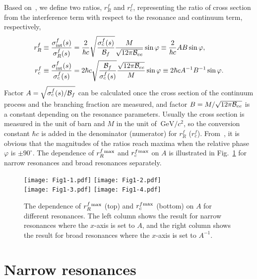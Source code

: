 \documentclass[%
preprint,
 amsmath,amssymb,
 aps,
]{revtex4-2}
\newcommand{\br}{{\cal B}}
\newcommand{\gevcc}{\mathrm{GeV}/c^2}
\begin{document}
Based on~, we define two ratios, $r_{R}^{f}$ 
and $r_{c}^{f}$, representing the ratio of cross section from the interference 
term with respect to the resonance and continuum term, respectively,
\begin{align}\label{eq:r}
    r_{R}^{f} & \equiv \frac{\sigma_{\rm int}^{f}(s)}{\sigma_{R}^{f}(s)} = 
    \frac{2}{\hbar c}\sqrt{\frac{\sigma_{c}^f(s)}{\br_{f}}}
    \frac{M}{\sqrt{12\pi\br_{ee}}}\sin\varphi
    \equiv \frac{2}{\hbar c} A B\sin\varphi,\\ \nonumber
    r_{c}^{f} & \equiv \frac{\sigma_{\rm int}^f(s)}{\sigma_{c}^f(s)} = 
    2{\hbar c}\sqrt{\frac{\br_{f}}{\sigma_{c}^f(s)}} 
    \frac{\sqrt{12\pi\br_{ee}}}{M}\sin\varphi
    \equiv 2 {\hbar c} A^{-1} B^{-1} \sin\varphi.
\end{align}
Factor $A=\sqrt{\sigma_{c}^f(s)/\br_{f}}$ can be calculated 
once the cross section of the continuum process and the branching fraction 
are measured, and factor $B=M/\sqrt{12\pi\br_{ee}}$ is a constant
depending on the resonance parameters. Usually the cross section is measured 
in the unit of barn and $M$ in the unit of $~\gevcc$, so the conversion 
constant $\hbar c$ is added in the denominator (numerator) for 
$r_{R}^{f}$ ($r_{c}^{f}$). From~, it is obvious that the magnitudes
of the ratios reach maxima when the relative phase $\varphi$ is $\pm 90^{\circ}$. 
The dependence of $r_{R}^{f}{}^{\rm max}$ and $r_{c}^{f}{}^{\rm max}$
on $A$ is illustrated in Fig.~\ref{fig:r-vs-A} for narrow resonances and broad
resonances separately. 

\begin{figure}[htbp]
    \centering
    \texttt{[image: Fig1-1.pdf]}
    \texttt{[image: Fig1-2.pdf]}\\
    \texttt{[image: Fig1-3.pdf]}
    \texttt{[image: Fig1-4.pdf]}
    \caption{The dependence of $r_{R}^{f}{}^{\rm max}$ (top) and 
    $r_{c}^{f}{}^{\rm max}$ 
    (bottom) on $A$ for different resonances. The left column shows the 
    result for narrow resonances where the $x$-axis is set to $A$, and the 
    right column shows the result for broad resonances where the $x$-axis 
    is set to $A^{-1}$.}
    \label{fig:r-vs-A}
\end{figure}


\section{Narrow resonances}\label{ch:narrow-res}
\end{document}
